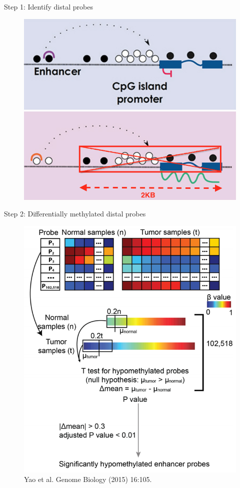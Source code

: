 \documentclass[slidestop,compress,11pt,xcolor=dvipsnames]{beamer}
\begin{document}


\begin{frame}{Step 1: Identify distal probes}
 \begin{figure}
  \centering
  \includegraphics[width=0.7\linewidth]{step1.png}
 \end{figure}
\end{frame}


\begin{frame}{Step 2: Differentially methylated distal probes}
 \vspace*{-0.3cm}
 \begin{figure}
  \centering
  \includegraphics[width=0.5\linewidth]{ELMER/diffmeth.png}{\tiny{\\Yao et al. Genome Biology (2015) 16:105.}}
 \end{figure}
\end{frame}


\end{document}
